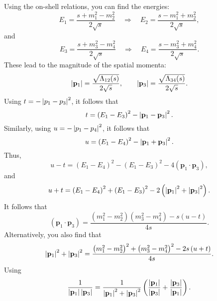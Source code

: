 Using the on-shell relations, you can find the energies:
\begin{equation}
	E_{1} = \frac{s + m_{1}^{2} - m_{2}^{2}}{2 \sqrt{s}} \quad \Longrightarrow \quad E_{2} = \frac{s - m_{1}^{2} + m_{2}^{2}}{2 \sqrt{s}},
\end{equation}
and
\begin{equation}
	E_{3} = \frac{s + m_{3}^{2} - m_{4}^{2}}{2 \sqrt{s}} \quad \Longrightarrow \quad E_{4} = \frac{s - m_{3}^{2} + m_{4}^{2}}{2 \sqrt{s}}.
\end{equation}
These lead to the magnitude of the spatial momenta:
\begin{equation}
	\left\lvert \mathbf{p}_{1} \right\rvert = \frac{\sqrt{\Lambda_{12}(s)}}{2 \sqrt{s}}, \qquad \left\lvert \mathbf{p}_{3} \right\rvert = \frac{\sqrt{\Lambda_{34}(s)}}{2 \sqrt{s}}.
\end{equation}
Using $t = -\left\lvert p_{1} - p_{3} \right\rvert^{2}$, it follows that
\begin{equation}
	t = \left( E_{1} - E_{3} \right)^{2} - \left\lvert \mathbf{p}_{1} - \mathbf{p}_{3} \right\rvert^{2}.
\end{equation}
Similarly, using $u = -\left\lvert p_{1} - p_{4} \right\rvert^{2}$, it follows that
\begin{equation}
	u = \left( E_{1} - E_{4} \right)^{2} - \left\lvert \mathbf{p}_{1} + \mathbf{p}_{3} \right\rvert^{2}.
\end{equation}
Thus,
\begin{equation}
	u - t = \left( E_{1} - E_{4} \right)^{2} - \left( E_{1} - E_{3} \right)^{2} - 4 \left( \mathbf{p}_{1} \cdot \mathbf{p}_{3} \right),
\end{equation}
and
\begin{equation}
	u + t = \left( E_{1} - E_{4} \right)^{2} + \left( E_{1} - E_{3} \right)^{2} - 2 \left( \left\lvert \mathbf{p}_{1} \right\rvert^{2} + \left\lvert \mathbf{p}_{3} \right\rvert^{2} \right).
\end{equation}
It follows that
\begin{equation}
	\left( \mathbf{p}_{1} \cdot \mathbf{p}_{3} \right) = \frac{ \left( m_{1}^{2} - m_{2}^{2} \right) \left( m_{3}^{2} - m_{4}^{2} \right) - s \left(u - t\right) }{4s}.
\end{equation}
Alternatively, you also find that
\begin{equation}
	\left\lvert \mathbf{p}_{1} \right\rvert^{2} + \left\lvert \mathbf{p}_{3} \right\rvert^{2} = \frac{\left( m_{1}^{2} - m_{2}^{2} \right)^{2} +  \left( m_{3}^{2} - m_{4}^{2} \right)^{2} - 2s \left(u + t\right)}{4s}.
\end{equation}
Using
\begin{equation}
	\frac{1}{\left\lvert \mathbf{p}_{1} \right\rvert \left\lvert \mathbf{p}_{3} \right\rvert} = \frac{1}{\left\lvert \mathbf{p}_{1} \right\rvert^{2} + \left\lvert \mathbf{p}_{3} \right\rvert^{2}} \left( \frac{\left\lvert \mathbf{p}_{1} \right\rvert}{\left\lvert \mathbf{p}_{3} \right\rvert} + \frac{\left\lvert \mathbf{p}_{3} \right\rvert}{\left\lvert \mathbf{p}_{1} \right\rvert} \right).
\end{equation}
